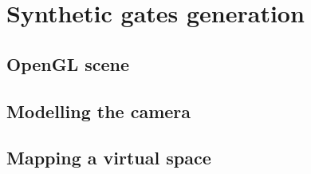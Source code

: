 \section{Synthetic gates generation}

\subsection{OpenGL scene}
\subsection{Modelling the camera}
\subsection{Mapping a virtual space}
